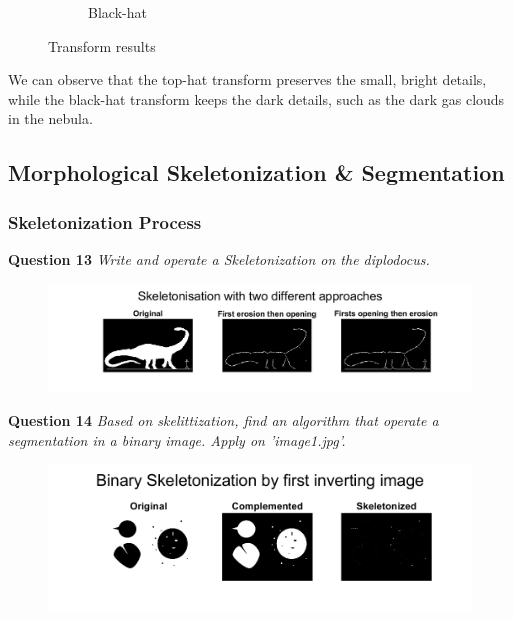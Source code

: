 \begin{figure}[!ht]
\begin{subfigure}{0.32\textwidth}
        \caption{Black-hat}
    \end{subfigure}
    \caption{Transform results}
    \label{fig:enter-label}
\end{figure}
We can observe that the top-hat transform preserves the small, bright details, while the black-hat transform keeps the dark details, such as the dark gas clouds in the nebula.



\newpage
\subsection{Morphological Skeletonization \& Segmentation}
\subsubsection{Skeletonization Process}
\textbf{Question 13} \textit{Write and operate a Skeletonization on the diplodocus.}

\begin{figure}[H]
    \centering
    \includegraphics[width=\linewidth]{Doc/Graphics/Part2/part2_Q13.png}
\end{figure}


\textbf{Question 14} \textit{Based on skelittization, ﬁnd an algorithm that operate a segmentation in a binary image. Apply on ’image1.jpg’.}

\begin{figure}[H]
    \centering
    \includegraphics[width=\linewidth]{Doc/Graphics/Part2/part2_Q14.png}
\end{figure}



